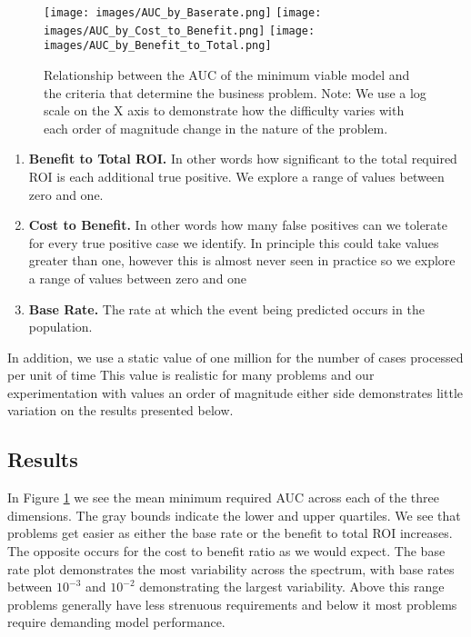 \documentclass[11pt,a4paper]{article}
\begin{document}
\begin{figure}[!ht]
\texttt{[image: images/AUC\_by\_Baserate.png]}
\texttt{[image: images/AUC\_by\_Cost\_to\_Benefit.png]}
\texttt{[image: images/AUC\_by\_Benefit\_to\_Total.png]}
\caption{Relationship between the AUC of the minimum viable model and the criteria that determine
the business problem. Note: We use a log scale on the X axis to demonstrate how
the difficulty varies with each order of magnitude change in the nature of the problem.
}
\label{fig:threeplots}
\end{figure}

\begin{enumerate}
        \item \textbf{Benefit to Total ROI.} In other words how significant to the total required ROI is
each additional true positive. We explore a range of values between zero and one.

        \item \textbf{Cost to Benefit.} In other words how many false positives can we tolerate for every
true positive case we identify. In principle this could take values greater than one, however this
is almost never seen in practice so we explore a range of values between zero and one

        \item \textbf{Base Rate.} The rate at which the event being predicted occurs in the population.

\end{enumerate}

In addition, we use a static value of one million for the number of cases processed per unit of time
This value is realistic for many problems and our experimentation with values
an order of magnitude either side demonstrates little variation on the results presented below.

\subsection{Results}

In Figure \ref{fig:threeplots} we see the mean minimum required AUC across each of the three dimensions.
The gray bounds indicate the lower and upper quartiles. We see that problems get easier as either the base
rate or the benefit to total ROI increases. The opposite occurs for the cost to benefit ratio as we would
expect. The base rate plot demonstrates the most variability across the spectrum, with base rates between
$10^{-3}$ and $10^{-2}$ demonstrating the largest variability. Above this range problems generally have less
strenuous requirements and below it most problems require demanding model performance.
\end{document}

